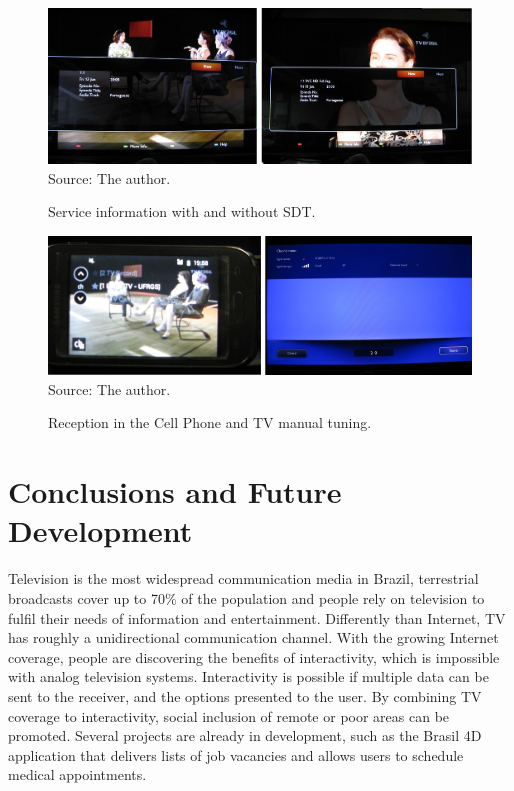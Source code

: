 \documentclass[
	12pt,				%
	openright,			%
	twoside,			%
	a4paper,			%
	brazil,
	french,				%
	english
	]{abntex2}
\begin{document}
\begin{figure}[!h]
\centering
\includegraphics[width=0.9\linewidth]{figuras/info_with_without_sdt.jpg}
\\Source: The author.
\caption{Service information with and without SDT.}
\label{fig:info_with_without_sdt}
\end{figure}

\begin{figure}[!h]
\centering
\includegraphics[width=0.9\linewidth]{figuras/cell_with_sdt.jpg}
\\Source: The author.
\caption{Reception in the Cell Phone and TV manual tuning.}
\label{fig:cell_with_sdt}
\end{figure}

%


\chapter[Conclusions and Future Development]{Conclusions and Future Development}


Television is the most widespread communication media in Brazil, terrestrial broadcasts cover up to 70\% of the population and people rely on television to fulfil their needs of information and entertainment. Differently than Internet, TV has roughly a unidirectional communication channel. With the growing Internet coverage, people are discovering the benefits of interactivity, which is impossible with analog television systems. Interactivity is possible if multiple data can be sent to the receiver, and the options presented to the user. By combining TV coverage to interactivity, social inclusion of remote or poor areas can be promoted. Several projects are already in development, such as the Brasil 4D application that delivers lists of job vacancies and allows users to schedule medical appointments.
\end{document}

